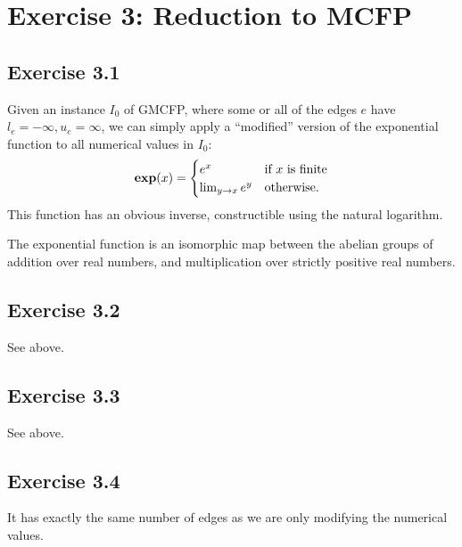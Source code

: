 \section{Exercise 3: Reduction to MCFP}

\subsection{Exercise 3.1}

Given an instance $I_0$ of GMCFP, where some or
all of the edges $e$ have $l_e = -\infty, u_e = \infty$, we can
simply apply a ``modified'' version of the exponential function to
all numerical values in $I_0$:
\begin{align}
  \bm{\mathrm{exp}}(x) = \begin{cases}
    e^x & \text{if $x$ is finite} \\
    \lim_{y\to x} e^y & \text{otherwise.}
  \end{cases}
\end{align}
This function has an obvious inverse, constructible using the natural logarithm.

The exponential function is an isomorphic map between the abelian groups of addition
over real numbers, and multiplication over strictly positive real numbers.

\subsection{Exercise 3.2}

See above.

\subsection{Exercise 3.3}

See above.

\subsection{Exercise 3.4}

It has exactly the same number of edges as we are only modifying the numerical values.
